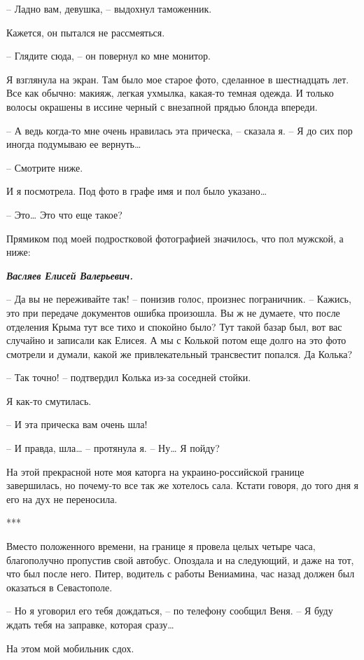 \documentclass[
]{book}
\begin{document}
-- Ладно вам, девушка, -- выдохнул таможенник.

Кажется, он пытался не рассмеяться.

-- Глядите сюда, -- он повернул ко мне монитор.

Я взглянула на экран. Там было мое старое фото, сделанное в шестнадцать лет. Все как обычно: макияж, легкая ухмылка, какая-то темная одежда. И только волосы окрашены в иссине черный с внезапной прядью блонда впереди.

-- А ведь когда-то мне очень нравилась эта прическа, -- сказала я. -- Я до сих пор иногда подумываю ее вернуть\ldots{}

-- Смотрите ниже.

И я посмотрела. Под фото в графе имя и пол было указано\ldots{}

-- Это\ldots{} Это что еще такое?

Прямиком под моей подростковой фотографией значилось, что пол мужской, а ниже:

\textbf{\emph{Васляев Елисей Валерьевич.}}

-- Да вы не переживайте так! -- понизив голос, произнес пограничник. -- Кажись, это при передаче документов ошибка произошла. Вы ж не думаете, что после отделения Крыма тут все тихо и спокойно было? Тут такой базар был, вот вас случайно и записали как Елисея. А мы с Колькой потом еще долго на это фото смотрели и думали, какой же привлекательный трансвестит попался. Да Колька?

-- Так точно! -- подтвердил Колька из-за соседней стойки.

Я как-то смутилась.

-- И эта прическа вам очень шла!

-- И правда, шла\ldots{} -- протянула я. -- Ну\ldots{} Я пойду?

На этой прекрасной ноте моя каторга на украино-российской границе завершилась, но почему-то все так же хотелось сала. Кстати говоря, до того дня я его на дух не переносила.

***

Вместо положенного времени, на границе я провела целых четыре часа, благополучно пропустив свой автобус. Опоздала и на следующий, и даже на тот, что был после него. Питер, водитель с работы Вениамина, час назад должен был оказаться в Севастополе.

-- Но я уговорил его тебя дождаться, -- по телефону сообщил Веня. -- Я буду ждать тебя на заправке, которая сразу\ldots{}

На этом мой мобильник сдох.
\end{document}
